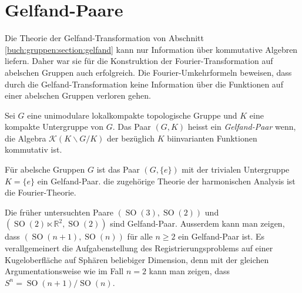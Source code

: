 %
%
%
\section{Gelfand-Paare
\label{buch:nichtkomm:section:gelfand}}
Die Theorie der Gelfand-Transformation von Abschnitt
\ref{buch:gruppen:section:gelfand}
kann nur Information über kommutative Algebren liefern.
Daher war sie für die Konstruktion der Fourier-Transformation
auf abelschen Gruppen auch erfolgreich.
Die Fourier-Umkehrformeln beweisen, dass durch die Gelfand-Transformation
keine Information über die Funktionen auf einer abelschen Gruppen
verloren gehen.

\begin{definition}
Sei $G$ eine unimodulare lokalkompakte topologische Gruppe und
$K$ eine kompakte Untergruppe von $G$.
Das Paar $(G,K)$ heisst ein {\em Gelfand-Paar} wenn, die Algebra
$\mathscr{K}(K\backslash G/K)$ der bezüglich $K$ biinvarianten Funktionen
kommutativ ist.
\end{definition}

Für abelsche Gruppen $G$ ist das Paar $(G,\{e\})$ mit der trivialen
Untergruppe $K=\{e\}$ ein Gelfand-Paar.
die zugehörige Theorie der harmonischen Analysis ist die Fourier-Theorie.

Die früher untersuchten Paare $(\operatorname{SO}(3),\operatorname{SO}(2))$
und $(\operatorname{SO}(2)\ltimes \mathbb{R}^2,\operatorname{SO}(2))$
sind Gelfand-Paar.
Ausserdem kann man zeigen, dass $(\operatorname{SO}(n+1),\operatorname{SO}(n))$
für alle $n\ge 2$ ein Gelfand-Paar ist.
Es verallgemeinert die Aufgabenstellung des Registrierungsproblems
auf einer Kugeloberfläche auf Sphären beliebiger Dimension, denn mit
der gleichen Argumentationsweise wie im Fall $n=2$ kann man zeigen,
dass $S^n = \operatorname{SO}(n+1)/\operatorname{SO}(n)$.



